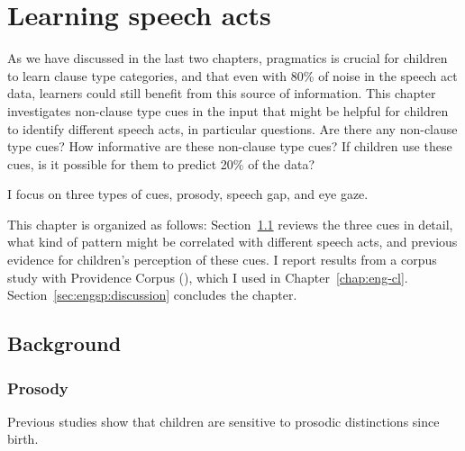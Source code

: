 \chapter{Learning speech acts}
\label{chap:eng-sp}
As we have discussed in the last two chapters, pragmatics is crucial for children to learn clause type categories, and that even with 80\% of noise in the speech act data, learners could still benefit from this source of information. This chapter investigates non-clause type cues in the input that might be helpful for children to identify different speech acts, in particular questions. Are there any non-clause type cues? How informative are these non-clause type cues? If children use these cues, is it possible for them to predict 20\% of the data? 

I focus on three types of cues, prosody, speech gap, and eye gaze. 

This chapter is organized as follows: Section~\ref{sec:engsp:background} reviews the three cues in detail, what kind of pattern might be correlated with different speech acts, and previous evidence for children's perception of these cues. I report results from a corpus study with Providence Corpus (\cite{ProvidenceCorpus}), which I used in Chapter~\ref{chap:eng-cl}. %
Section~\ref{sec:engsp:discussion} concludes the chapter.


\section{Background}
\label{sec:engsp:background}
\subsection{Prosody}
\label{sec:engsp:bg:prosody}

Previous studies show that children are sensitive to prosodic distinctions since birth. %


